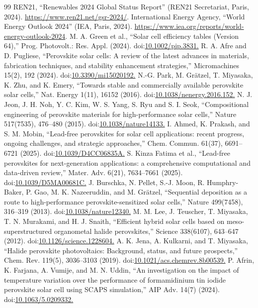 \documentclass[aip,amsmath,amssymb,preprint]{revtex4-2}
\begin{document}
\begin{thebibliography}{99}
 REN21, ``Renewables 2024 Global Status Report'' (REN21 Secretariat, Paris, 2024). \url{https://www.ren21.net/gsr-2024/}.
 International Energy Agency, ``World Energy Outlook 2024'' (IEA, Paris, 2024). \url{https://www.iea.org/reports/world-energy-outlook-2024}.
 M. A. Green et al., ``Solar cell efficiency tables (Version 64),'' Prog. Photovolt.: Res. Appl. (2024). doi:\url{10.1002/pip.3831.}
 R. A. Afre and D. Pugliese, ``Perovskite solar cells: A review of the latest advances in materials, fabrication techniques, and stability enhancement strategies,'' Micromachines 15(2), 192 (2024). doi:\url{10.3390/mi15020192.}
 N.-G. Park, M. Grätzel, T. Miyasaka, K. Zhu, and K. Emery, ``Towards stable and commercially available perovskite solar cells,'' Nat. Energy 1(11), 16152 (2016). doi:\url{10.1038/nenergy.2016.152.}
 N. J. Jeon, J. H. Noh, Y. C. Kim, W. S. Yang, S. Ryu and S. I. Seok, ``Compositional engineering of perovskite materials for high-performance solar cells,'' Nature 517(7535), 476--480 (2015). doi:\url{10.1038/nature14133.}
 I. Ahmed, K. Prakash, and S. M. Mobin, ``Lead-free perovskites for solar cell applications: recent progress, ongoing challenges, and strategic approaches,'' Chem. Commun. 61(37), 6691--6721 (2025). doi:\url{10.1039/D4CC06835A.}
 S. Kinza Fatima et al., ``Lead-free perovskites for next-generation applications: a comprehensive computational and data-driven review,'' Mater. Adv. 6(21), 7634--7661 (2025). doi:\url{10.1039/D5MA00681C.}
 J. Burschka, N. Pellet, S.-J. Moon, R. Humphry-Baker, P. Gao, M. K. Nazeeruddin, and M. Grätzel, ``Sequential deposition as a route to high-performance perovskite-sensitized solar cells,'' Nature 499(7458), 316--319 (2013). doi:\url{10.1038/nature12340.}
 M. M. Lee, J. Teuscher, T. Miyasaka, T. N. Murakami, and H. J. Snaith, ``Efficient hybrid solar cells based on meso-superstructured organometal halide perovskites,'' Science 338(6107), 643--647 (2012). doi:\url{10.1126/science.1228604.}
 A. K. Jena, A. Kulkarni, and T. Miyasaka, ``Halide perovskite photovoltaics: Background, status, and future prospects,'' Chem. Rev. 119(5), 3036--3103 (2019). doi:\url{10.1021/acs.chemrev.8b00539.}
 P. Afrin, K. Farjana, A. Vumije, and M. N. Uddin, ``An investigation on the impact of temperature variation over the performance of formamidinium tin iodide perovskite solar cell using SCAPS simulation,'' AIP Adv. 14(7) (2024). doi:\url{10.1063/5.0209332.}

\end{thebibliography}
\end{document}
